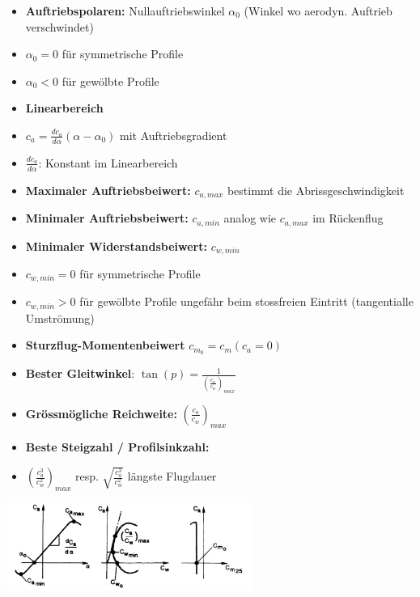 \documentclass[8pt, landscape, fleqn]{scrartcl}
\begin{document}
\begin{multicols*}{3}
\begin{itemize}
    \item \textbf{Auftriebspolaren:} Nullauftriebswinkel $\alpha_0$ (Winkel wo aerodyn. Auftrieb verschwindet)
    \item $\alpha_0 = 0$ für symmetrische Profile
    \item $\alpha_0 < 0$ für gewölbte Profile
    \item \textbf{Linearbereich}
    \item $c_a = \frac{dc_a}{d\alpha}(\alpha-\alpha_0)$ mit Auftriebsgradient 
    \item $\frac{dc_a}{d\alpha}$: Konstant im Linearbereich
    \item \textbf{Maximaler Auftriebsbeiwert:} $c_{a,max}$ bestimmt die Abrissgeschwindigkeit
    \item \textbf{Minimaler Auftriebsbeiwert:} $c_{a,min}$ analog wie $c_{a,max}$ im Rückenflug
    \item \textbf{Minimaler Widerstandsbeiwert:} $c_{w,min}$ 
    \item $c_{w,min} = 0$ für symmetrische Profile
    \item $c_{w,min} > 0$ für gewölbte Profile ungefähr beim stossfreien Eintritt (tangentialle Umströmung)
    \item \textbf{Sturzflug-Momentenbeiwert} $c_{m_0} = c_m(c_a = 0)$
    \item \textbf{Bester Gleitwinkel}: $\tan(p) = \frac{1}{(\frac{c_a}{c_w})_{max}}$
    \item \textbf{Grössmögliche Reichweite:} $(\frac{c_a}{c_w})_{max}$
    \item \textbf{Beste Steigzahl / Profilsinkzahl:}
    \item $(\frac{c_a^3}{c_w^2})_{max}$ resp. $\sqrt{\frac{c_a^3}{c_w^2}}$ längste Flugdauer 
\end{itemize}

\begin{center}
    \includegraphics[width = 8cm]{images/Aufstiegspolaren.png}
\end{center}


\end{multicols*}
\end{document}
